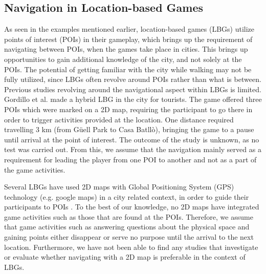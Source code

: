 \subsection{Navigation in Location-based Games}
As seen in the examples mentioned earlier, location-based games (LBGs) utilize points of interest (POIs) in their gameplay, which brings up the requirement of navigating between POIs, when the games take place in cities. This brings up opportunities to gain additional knowledge of the city, and not solely at the POIs. The potential of getting familiar with the city while walking may not be fully utilized, since LBGs often revolve around POIs rather than what is between. Previous studies revolving around the navigational aspect within LBGs is limited. 
Gordillo et al. made a hybrid LBG in the city for tourists\cite{Learninggamified}. The game offered three POIs which were marked on a 2D map, requiring the participant to go there in order to trigger activities provided at the location.  One distance required travelling 3 km (from G\"uell Park to Casa Batll\`{o}), bringing the game to a pause until arrival at the point of interest.  The outcome of the study is unknown, as no test was carried out. From this, we assume that the navigation mainly served as a requirement for leading the player from one POI to another and not as a part of the game activities.

Several LBGs have used 2D maps with Global Positioning System (GPS) technology (e.g. google maps) in a city related context, in order to guide their participants to POIs \cite{TheoreticalAndMethod, Learninggamified, knowcity, Carrigy:2010:DEP:1868914.1868929, GamingTourism, Procyk:2013:GLG:2468356.2468550, Bell:2009:ESN:1518701.1518723}. To the best of our knowledge, no 2D maps have integrated game activities such as those that are found at the POIs. Therefore, we assume that game activities such as answering questions about the physical space and gaining points either disappear or serve no purpose until the arrival to the next location. Furthermore, we have not been able to find any studies that investigate or evaluate whether navigating with a 2D map is preferable in the context of LBGs.

